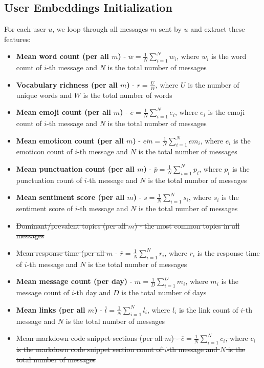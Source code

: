 \documentclass{article}
\begin{document}
\subsection{User Embeddings Initialization}
For each user $u$, we loop through all messages $m$ sent by $u$ and extract these features:
\begin{itemize}
	\item \textbf{Mean word count (per all $m$)} - \(\overline{w} = \frac{1}{N} \sum_{i=1}^{N} w_i \), where $w_i$ is the word count of $i$-th message and $N$ is the total number of messages
	\item \textbf{Vocabulary richness (per all $m$)} - \(r = \frac{U}{W} \), where $U$ is the number of unique words and $W$ is the total number of words
	\item \textbf{Mean emoji count (per all $m$)} - \(\overline{e} = \frac{1}{N} \sum_{i=1}^{N} e_i \), where $e_i$ is the emoji count of $i$-th message and $N$ is the total number of messages
	\item \textbf{Mean emoticon count (per all $m$)} - \(\overline{em} = \frac{1}{N} \sum_{i=1}^{N} em_i \), where $e_i$ is the emoticon count of $i$-th message and $N$ is the total number of messages
	\item \textbf{Mean punctuation count (per all $m$)} - \(\overline{p} = \frac{1}{N} \sum_{i=1}^{N} p_i \), where $p_i$ is the punctuation count of $i$-th message and $N$ is the total number of messages
	\item \textbf{Mean sentiment score (per all $m$)} - \(\overline{s} = \frac{1}{N} \sum_{i=1}^{N} s_i \), where $s_i$ is the sentiment score of $i$-th message and $N$ is the total number of messages
	\item \sout{Dominant/prevalent topics (per all $m$) - the most common topics in all messages}
	\item \sout{Mean response time (per all $m$} - \(\overline{r} = \frac{1}{N} \sum_{i=1}^{N} r_i \), where $r_i$ is the response time of $i$-th message and $N$ is the total number of messages
	\item \textbf{Mean message count (per day)} - \(\overline{m} = \frac{1}{D} \sum_{i=1}^{D} m_i \), where $m_i$ is the message count of $i$-th day and $D$ is the total number of days
	\item \textbf{Mean links (per all $m$)} - \(\overline{l} = \frac{1}{N} \sum_{i=1}^{N} l_i \), where $l_i$ is the link count of $i$-th message and $N$ is the total number of messages
	\item \sout{Mean markdown code snippet sections (per all $m$) - \(\overline{c} = \frac{1}{N} \sum_{i=1}^{N} c_i \), where $c_i$ is the markdown code snippet section count of $i$-th message and $N$ is the total number of messages}

\end{itemize}
\end{document}

